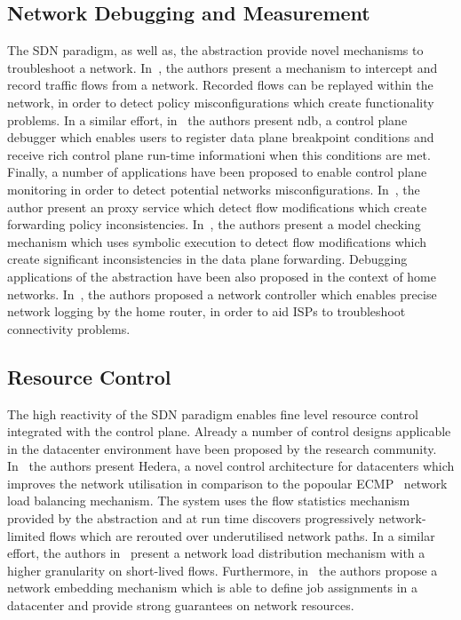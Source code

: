 \subsection{Network Debugging and Measurement}

The SDN paradigm, as well as, the \of abstraction provide novel mechanisms to
troubleshoot a network. In~\cite{Wundsam11}, the authors present a mechanism to
intercept and record traffic flows from a network. Recorded flows can be
replayed within the network, in order to detect policy misconfigurations which
create functionality problems. In a similar effort, in~\cite{Handigol12} the
authors present ndb, a control plane debugger which enables users to register
data plane breakpoint conditions and receive rich control plane run-time
informationi when this conditions are met. Finally, a number of applications
have been proposed to enable control plane monitoring in order to detect
potential networks misconfigurations. In~\cite{Khurshid12}, the author present
an \of proxy service which detect flow modifications which create
forwarding policy inconsistencies.  In~\cite{Canini12}, the authors present a model
checking mechanism which uses symbolic execution to detect flow modifications
which create significant inconsistencies in the data plane forwarding.
Debugging applications of the \of abstraction have been also proposed in the
context of home networks.  In~\cite{Calvert10}, the authors proposed a network
controller which enables precise network logging by the home router, in
order to aid ISPs to troubleshoot connectivity problems. 


\subsection{Resource Control}

The high reactivity of the SDN paradigm 
enables fine level resource control integrated with the control plane.
Already a number of control designs applicable in the datacenter environment
have been proposed by the research community. 
In~\cite{Al-Fares10} the authors present Hedera, a
novel control architecture for datacenters which improves the network
utilisation in comparison to the popoular ECMP~\cite{RFC2992} network load
balancing mechanism. The system uses the flow statistics mechanism provided by
the \of abstraction and at run time discovers progressively network-limited
flows which are rerouted over underutilised network paths. In a similar
effort, the authors in~\cite{Benson11} present a network load distribution mechanism
with a higher granularity on short-lived flows. Furthermore,
in~\cite{Even12} the authors propose a network embedding mechanism which is able
to define job assignments in a datacenter and provide strong guarantees on
network resources.

